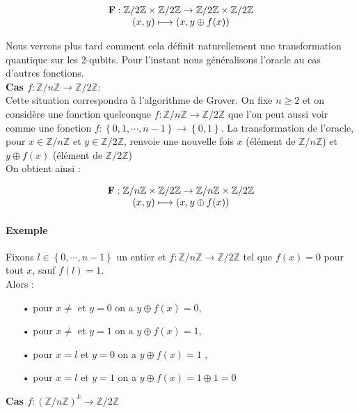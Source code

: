 \documentclass[12pt,openany]{report}
\begin{document}
\[  
 \left.
\begin{array}{ c  c }
\mathbf{F}: \mathbb{Z}/2\mathbb{Z} \times \mathbb{Z}/2\mathbb{Z} \rightarrow \mathbb{Z}/2\mathbb{Z} \times \mathbb{Z}/2\mathbb{Z}\\
(x,y) \longmapsto (x,y \oplus f(x))

\end{array}
\right.
\]

Nous verrons plus tard comment cela définit naturellement une transformation quantique sur les 2-qubits.
Pour l’instant nous généralisons l’oracle au cas d’autres fonctions.\\
\textbf{Cas $ f: \mathbb{Z}/n\mathbb{Z} \rightarrow \mathbb{Z}/2\mathbb{Z} $}:\\

Cette situation correspondra à l’algorithme de Grover. On fixe $n \geq 2$ et on considère une fonction quelconque
$ f : \mathbb{Z}/n\mathbb{Z}\rightarrow \mathbb{Z}/2\mathbb{Z}$ que l’on peut aussi voir comme une fonction $ f : \left\lbrace 0, 1,\cdots , n- 1 \right\rbrace  \rightarrow \left\lbrace  0, 1\right\rbrace $.
La transformation de l’oracle, pour  $ x \in  \mathbb{Z}/n\mathbb{Z}  $ et $ y \in \mathbb{Z}/2\mathbb{Z} $, renvoie une nouvelle fois $x$ (élément de $ \mathbb{Z}/n\mathbb{Z} $)
et $y \oplus f (x)$  (élément de $ \mathbb{Z}/2\mathbb{Z} $)\\
On obtient ainsi :

\[  
 \left.
\begin{array}{ c  c }
\mathbf{F}: \mathbb{Z}/n\mathbb{Z} \times \mathbb{Z}/2\mathbb{Z} \rightarrow \mathbb{Z}/n \mathbb{Z} \times \mathbb{Z}/2\mathbb{Z}\\
(x,y) \longmapsto (x,y \oplus f(x))

\end{array}
\right.
\]

\paragraph{Exemple\\}


Fixons $ l \in \left\lbrace 0,\cdots, n-1 \right\rbrace $ un entier et $f : \mathbb{Z}/n\mathbb{Z} \rightarrow \mathbb{Z}/2\mathbb{Z} $ tel que $f (x) = 0$ pour tout $x$, sauf $f (l) = 1$.\\
Alors :

\begin{itemize}

\item[•] pour $x \neq $ et $y = 0$ on a $y \oplus f (x) = 0$,
\item[•] pour $x \neq $ et $y = 1$ on a $ y \oplus f (x) = 1$,
\item[•] pour $x = l $ et $y = 0 $ on a $y \oplus f (x) = 1$ ,
\item[•] pour $ x = l $ et $y = 1 $ on a $ y \oplus f (x) = 1 \oplus 1 = 0$
\end{itemize}
\textbf{Cas $ f:( \mathbb{Z}/n\mathbb{Z})^k \rightarrow \mathbb{Z}/2\mathbb{Z} $ \\}
\end{document}
